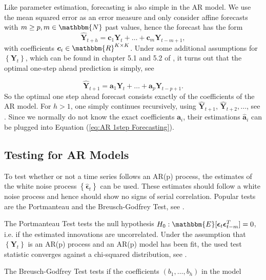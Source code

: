 Like parameter estimation, forecasting is also simple in the AR model. We use the mean squared error as an error measure and only consider affine forecasts with $m\geq p,m \in \mathbbm{N}$ past values, hence the forecast has the form
\begin{equation}
\hat{\bm{Y}}_{t+h} = \bm{c}_1\bm{Y}_{t} + \ldots + \bm{c}_m\bm{Y}_{t-m+1},
\label{eq:Forecasting general}
\end{equation}
%
with coefficients $\bm{c}_i \in \mathbbm{R}^{K \times K}$. Under some additional assumptions for $\left\{\bm{Y}_t\right\}$, which can be found in chapter 5.1 and 5.2 of \textcite{Scherrer:2021}, it turns out that the optimal one-step ahead prediction is simply, see \textcite{Scherrer:2021}

\begin{equation}
\hat{\bm{Y}}_{t+1} = \bm{a}_1\bm{Y}_{t} + \ldots + \bm{a}_p\bm{Y}_{t-p+1}.
\label{eq:AR 1step Forecasting}
\end{equation}
%
So the optimal one step ahead forecast consists exactly of the coefficients of the AR model. For $h>1$, one simply continues recursively, using $\hat{\bm{Y}}_{t+1}$, $\hat{\bm{Y}}_{t+2},\ldots$, see \textcite{Scherrer:2021}. Since we normally do not know the exact coefficients $\bm{a}_i$, their estimations $\hat{\bm{a}}_i$ can be plugged into Equation (\ref{eq:AR 1step Forecasting}). 

\subsection{Testing for AR Models}
\label{sec: Testing for ar models}

To test whether or not a time series follows an AR(p) process, the estimates of the white noise process $\left\{\hat{\bm{\epsilon}}_t\right\}$ can be used. These estimates should follow a white noise process and hence should show no signs of serial correlation. Popular tests are the Portmanteau and the Breusch-Godfrey Test, see \textcite{Lütkepohl:2007}. 

The Portmanteau Test tests the null hypothesis $H_0: \mathbbm{E}[\bm{\epsilon}_t \bm{\epsilon}_{t-m}^T]=0$, i.e. if the estimated innovations are uncorrelated. Under the assumption that $\left\{\bm{Y}_t\right\}$ is an AR(p) process and an AR(p) model has been fit, the used test statistic converges against a chi-squared distribution, see \textcite{Lütkepohl:2007}. 

The Breusch-Godfrey Test tests if the coefficients $(b_1,\ldots,b_h)$ in the model 

